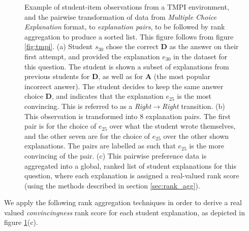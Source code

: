 \documentclass[notitlepage,12pt]{jedm}
\begin{document}
\begin{figure}[H]
	\centering
	\def\svgscale{0.40}
	
	\caption{
	Example of student-item observations from a TMPI environment, and the 
	pairwise transformation of data from \textit{Multiple Choice Explanation} 
	format, to \textit{explanation pairs}, to be followed by rank aggregation 
	to produce a sorted list. 
	This figure follows from figure \protect\ref{fig:tmpi}.
	(a) Student $s_{30}$ chose the correct \textbf{D} as the answer on 
	their first attempt, and provided the explanation $e_{30}$ in the 
	dataset for this question. 
	The student is shown a subset of explanations from previous students for 
	\textbf{D}, as well as for \textbf{A} (the most popular incorrect 
	answer). 
	The student decides to keep the same answer choice \textbf{D}, and 
	indicates that the explanation $e_{25}$ is the most convincing.
	This is referred to as a \textit{Right}$\rightarrow$\textit{Right} 
	transition.
	(b) This observation is transformed into 8 explanation pairs. The first 
	pair is for the choice of $e_{25}$ over what the student wrote themselves, 
	and the other seven are for the choice of $e_{25}$ over the other shown 
	explanations. 
	The pairs are labelled as such that $e_{25}$ is the more convincing of the 
	pair. 
	(c) This pairwise preference data is aggregated into a global, ranked list 
	of student explanations for this question, where each explanation is 
	assigned a real-valued rank score (using the methods described in section 
	\protect\ref{sec:rank_agg}).
}
\label{fig:make_pairs_a}
\end{figure}

We apply the following rank aggregation techniques in order to derive a real 
valued \textit{convincingness} rank score for each student explanation, as 
depicted in figure \ref{fig:make_pairs_a}(c).
\end{document}
